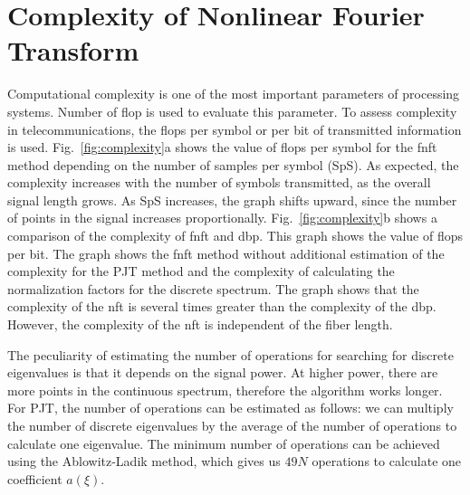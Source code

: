 \section{Complexity of Nonlinear Fourier Transform}


Computational complexity is one of the most important parameters of processing systems. Number of \acrfull{flop} is used to evaluate this parameter. To assess complexity in telecommunications, the \acrshort{flop}s per symbol or per bit of transmitted information is used. Fig.~\ref{fig:complexity}a shows the value of \acrshort{flop}s per symbol for the \acrshort{fnft} method depending on the number of samples per symbol (SpS). As expected, the complexity increases with the number of symbols transmitted, as the overall signal length grows. As SpS increases, the graph shifts upward, since the number of points in the signal increases proportionally. Fig.~\ref{fig:complexity}b shows a comparison of the complexity of \acrshort{fnft} and \acrshort{dbp}. This graph shows the value of \acrshort{flop}s per bit. The graph shows the \acrshort{fnft} method without additional estimation of the complexity for the PJT method and the complexity of calculating the normalization factors for the discrete spectrum.
The graph shows that the complexity of the \acrshort{nft} is several times greater than the complexity of the \acrshort{dbp}. However, the complexity of the \acrshort{nft} is independent of the fiber length.

The peculiarity of estimating the number of operations for searching for discrete eigenvalues is that it depends on the signal power. At higher power, there are more points in the continuous spectrum, therefore the algorithm works longer. For PJT, the number of operations can be estimated as follows: we can multiply the number of discrete eigenvalues by the average of the number of operations to calculate one eigenvalue. The minimum number of operations can be achieved using the Ablowitz-Ladik method, which gives us $49 N$ operations to calculate one coefficient $a(\xi)$.

